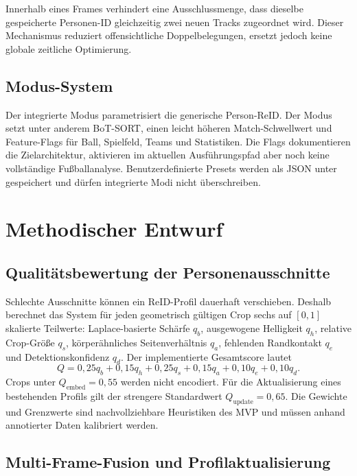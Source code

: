 \documentclass[runningheads]{llncs}
\begin{document}
Innerhalb eines Frames verhindert eine Ausschlussmenge, dass dieselbe gespeicherte Personen-ID gleichzeitig zwei neuen Tracks zugeordnet wird. Dieser Mechanismus reduziert offensichtliche Doppelbelegungen, ersetzt jedoch keine globale zeitliche Optimierung.

\subsection{Modus-System}

Der integrierte Modus  parametrisiert die generische Person-ReID. Der Modus  setzt unter anderem BoT-SORT, einen leicht höheren Match-Schwellwert und Feature-Flags für Ball, Spielfeld, Teams und Statistiken. Die Flags dokumentieren die Zielarchitektur, aktivieren im aktuellen Ausführungspfad aber noch keine vollständige Fußballanalyse. Benutzerdefinierte Presets werden als JSON unter  gespeichert und dürfen integrierte Modi nicht überschreiben.

\section{Methodischer Entwurf}

\subsection{Qualitätsbewertung der Personenausschnitte}

Schlechte Ausschnitte können ein ReID-Profil dauerhaft verschieben. Deshalb berechnet das System für jeden geometrisch gültigen Crop sechs auf $[0,1]$ skalierte Teilwerte: Laplace-basierte Schärfe $q_b$, ausgewogene Helligkeit $q_h$, relative Crop-Größe $q_s$, körperähnliches Seitenverhältnis $q_a$, fehlenden Randkontakt $q_e$ und Detektionskonfidenz $q_d$. Der implementierte Gesamtscore lautet
\begin{equation}
Q = 0{,}25q_b + 0{,}15q_h + 0{,}25q_s + 0{,}15q_a + 0{,}10q_e + 0{,}10q_d.
\label{eq:quality}
\end{equation}
Crops unter $Q_{\mathrm{embed}}=0{,}55$ werden nicht encodiert. Für die Aktualisierung eines bestehenden Profils gilt der strengere Standardwert $Q_{\mathrm{update}}=0{,}65$. Die Gewichte und Grenzwerte sind nachvollziehbare Heuristiken des MVP und müssen anhand annotierter Daten kalibriert werden.

\subsection{Multi-Frame-Fusion und Profilaktualisierung}
\end{document}
